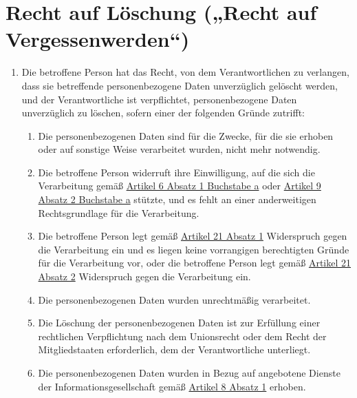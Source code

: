 \chapter{Recht auf Löschung („Recht auf Vergessenwerden“)}
\label{ch:17}


\begin{enumerate}

  \item Die betroffene Person hat das Recht, von dem Verantwortlichen zu verlangen, dass sie betreffende
   personenbezogene Daten unverzüglich gelöscht werden, und der Verantwortliche ist verpflichtet, personenbezogene
   Daten unverzüglich zu löschen, sofern einer der folgenden Gründe zutrifft:
  \label{itm:17-1}

  \begin{enumerate}
  
    \item Die personenbezogenen Daten sind für die Zwecke, für die sie erhoben oder auf sonstige Weise verarbeitet
     wurden, nicht mehr notwendig.
    \label{itm:17-1a}

    \item Die betroffene Person widerruft ihre Einwilligung, auf die sich die Verarbeitung gemäß \hyperref[itm:06-1a]
     {Artikel 6 Absatz 1 Buchstabe a} oder \hyperref[itm_09-2a]{Artikel 9 Absatz 2 Buchstabe a} stützte, und es fehlt
     an einer anderweitigen Rechtsgrundlage für die Verarbeitung.
    \label{itm:17-1b}

    \item Die betroffene Person legt gemäß \hyperref[itm:21-1]{Artikel 21 Absatz 1} Widerspruch gegen die Verarbeitung
     ein und es liegen keine vorrangigen berechtigten Gründe für die Verarbeitung vor, oder die betroffene Person legt
     gemäß \hyperref[itm:21-2]{Artikel 21 Absatz 2} Widerspruch gegen die Verarbeitung ein.
    \label{itm:17-1c}

    \item Die personenbezogenen Daten wurden unrechtmäßig verarbeitet.
    \label{itm:17-1d}

    \item Die Löschung der personenbezogenen Daten ist zur Erfüllung einer rechtlichen Verpflichtung nach dem
     Unionsrecht oder dem Recht der Mitgliedstaaten erforderlich, dem der Verantwortliche unterliegt.
    \label{itm:17-1e}

    \item Die personenbezogenen Daten wurden in Bezug auf angebotene Dienste der Informationsgesellschaft gemäß
     \hyperref[itm:08-1]{Artikel 8 Absatz 1} erhoben.
    \label{itm:17-1f}


\end{enumerate}
\end{enumerate}
